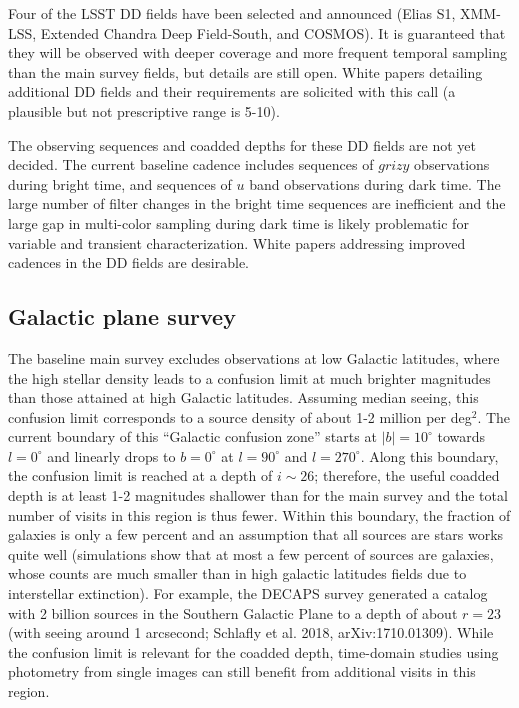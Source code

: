 \documentclass[DM,lsstdraft,toc,usenatbib]{lsstdoc}
\begin{document}
Four of the LSST DD fields have been selected and announced (Elias S1, 
XMM-LSS, Extended Chandra Deep Field-South, and COSMOS). It is guaranteed that they 
will be observed with deeper coverage and more frequent temporal sampling than the main 
survey fields, but details are still open. White papers detailing additional DD fields and their
requirements are solicited with this call (a plausible but not prescriptive range is 5-10).

The observing sequences and coadded depths for these DD fields are not yet decided. The current baseline
cadence includes sequences of $grizy$ observations during bright time, and sequences of $u$ 
band observations during dark time. The large number of filter changes in the bright time sequences
are inefficient and the large gap in multi-color sampling during dark time is likely problematic 
for variable and transient characterization. White papers addressing improved cadences 
in the DD fields are desirable.


\subsection{Galactic plane survey \label{sec:GP}}

The baseline main survey excludes observations at low Galactic latitudes, where the high 
stellar density leads to a confusion limit at much brighter magnitudes than those attained 
at high Galactic latitudes. Assuming median seeing, this confusion limit corresponds to a
source density of about 1-2 million per deg$^2$. The current boundary of this ``Galactic
confusion zone'' starts at $|b|=10^\circ$ towards $l=0^\circ$ and linearly drops to $b=0^\circ$
at $l=90^\circ$ and $l=270^\circ$. Along this boundary, the confusion limit is reached at a
depth of $i \sim 26$; therefore, the useful coadded depth is at least 1-2 magnitudes 
shallower than for the main survey and the total number of visits in this region is thus fewer. 
Within this boundary, the fraction of galaxies is only
a few percent and an assumption that all sources are stars works quite well (simulations show
that at most a few percent of sources are galaxies, whose counts are much smaller than in 
high galactic latitudes fields due to interstellar extinction). For example, the
DECAPS survey generated a catalog with 2 billion sources in the Southern Galactic Plane
to a depth of about $r=23$ (with seeing around 1 arcsecond; Schlafly et al. 2018, 
arXiv:1710.01309). While the confusion limit is relevant for the coadded depth, time-domain
studies using photometry from single images can still benefit from additional visits in this region.
\end{document}
